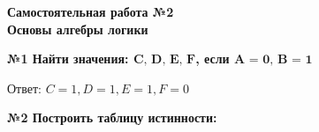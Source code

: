 



    \begin{center}
        \textbf{
            Самостоятельная работа №2\\
            Основы алгебры логики}
    \end{center}

    \begin{center}
        \textbf{№1 Найти значения: $\textbf{C, D, E, F}$, если $\textbf{A = 0, B = 1}$}
    \end{center}

    Ответ: $C = 1, D = 1, E = 1, F = 0$

    \begin{center}
        \textbf{№2 Построить таблицу истинности:}
    \end{center}


